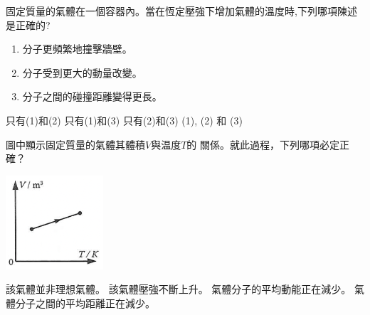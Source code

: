 {
    固定質量的氣體在一個容器內。當在恆定壓強下增加氣體的溫度時,下列哪項陳述是正確的?

    \begin{enumerate}[label=\sd]
        \item 分子更頻繁地撞擊牆壁。
        \item 分子受到更大的動量改變。
        \item 分子之間的碰撞距離變得更長。
    \end{enumerate}


    \begin{choices}
        \choice 只有(1)和(2)
        \choice 只有(1)和(3)
        \CorrectChoice 只有(2)和(3)
        \choice (1), (2) 和 (3)
    \end{choices}
}{}

{
圖中顯示固定質量的氣體其體積$V$與温度$T$的 關係。就此過程，下列哪項必定正確？
{\par
\centering
\includegraphics[width=.2\textwidth]{assets/8faae3c5.png}\par}

\begin{choices}
    \choice 該氣體並非理想氣體。
    \CorrectChoice 該氣體壓強不斷上升。
    \choice 氣體分子的平均動能正在減少。
    \choice 氣體分子之間的平均距離正在減少。
\end{choices}
}{}

